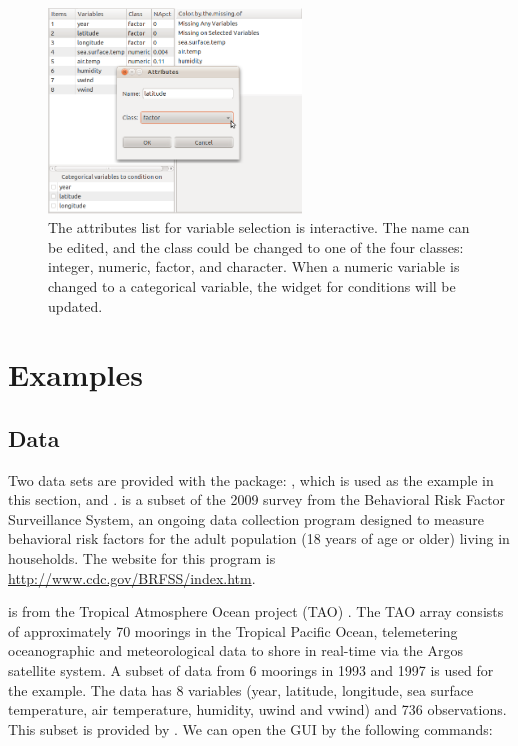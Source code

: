 \documentclass[article]{jss}
\begin{document}
\begin{center}
\begin{figure}[h]
\begin{centering}
\includegraphics[width=0.6\textwidth]{graph/fig8-query}
\par\end{centering}
\label{fig: attributes}
\caption{The attributes list for variable selection is interactive. The name can be edited, and the class could be changed to one of the four classes: integer, numeric, factor, and character. When a numeric variable is changed to a categorical variable, the widget for conditions will be updated.}
\end{figure}
\par\end{center}


\section{Examples}

\subsection{Data}

Two data sets are provided with the package: , which is used as the example in this section, and .  is a subset of the 2009 survey from the Behavioral Risk Factor Surveillance System, an ongoing data collection program designed to measure behavioral risk factors for the adult population (18 years of age or older) living in households. The website for this program is \url{http://www.cdc.gov/BRFSS/index.htm}.

 is from the Tropical Atmosphere Ocean project (TAO) \citep{tao}. The TAO array consists of approximately 70 moorings in the Tropical Pacific Ocean, telemetering oceanographic and meteorological data to shore in real-time via the Argos satellite system. A subset of data from 6 moorings in 1993 and 1997 is used for the example. The data has 8 variables (year, latitude, longitude, sea surface temperature, air temperature, humidity, uwind and vwind) and 736 observations. This subset is provided by \citet{CS07}. We can open the GUI by the following commands:
\end{document}
